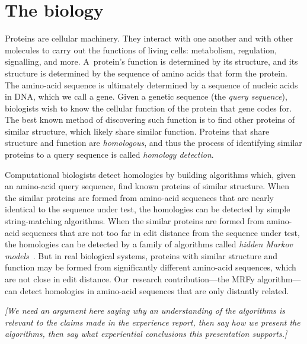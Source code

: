 \documentclass[preprint,nonatbib,blockstyle,nocopyrightspace,times]{sigplanconf}
\let\cite\citep
\begin{document}
\section{The biology}

Proteins are cellular machinery. They interact with one another and with other 
molecules to carry out the functions of living cells: metabolism, regulation, 
signalling, and more.
A~protein's function is determined by its structure, 
and its structure is determined by the sequence of amino acids that
form the protein.
The amino-acid sequence is ultimately determined by a sequence of
nucleic acids in DNA, which we call a gene.
Given a genetic sequence (the \textit{query sequence}), biologists wish to know the cellular
function of the protein that gene codes for.
The best known method of discovering such function is
to find other proteins of 
similar structure, which likely share similar function.
Proteins that share structure and function are \textit{homologous}, and thus
the process of identifying similar proteins to a query sequence is called 
\textit{homology detection}.




Computational biologists detect homologies by building 
algorithms which, given an amino-acid query sequence,
find known proteins of similar structure.
When the similar proteins are formed from amino-acid sequences that
are nearly identical to the sequence under test, the homologies can be
detected by  
simple string-matching algorithms.
When the similar proteins are formed from amino-acid sequences that
are not too far in edit distance from the sequence under test, the homologies can be
detected by
a family of algorithms called 
\textit{hidden Markov models}~\cite{Eddy:1998ut}.
But in real biological systems,
proteins with similar structure and function may be formed from significantly 
different amino-acid sequences, which are not close in edit distance.
Our~research contribution---the MRFy algorithm---can detect homologies
in amino-acid sequences that are only distantly related.
%

\emph{[We need an argument here saying why an understanding of the
    algorithms is relevant to the claims made in the experience
    report, then say how we present the algorithms, then say what
    experiential conclusions this presentation supports.]}
\end{document}
